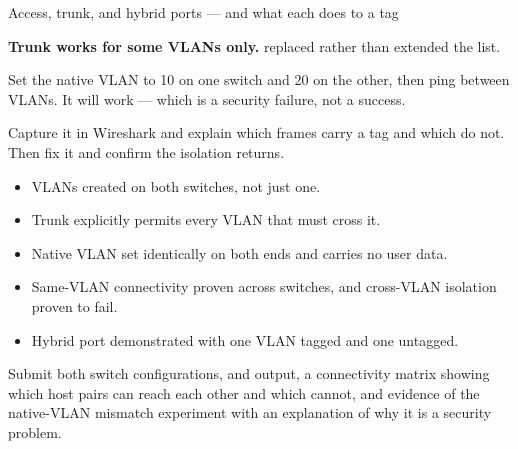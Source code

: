 \begin{labproject}{Access, trunk, and hybrid ports --- and what each does to a tag}
\begin{troubleshoot}
\textbf{Trunk works for some VLANs only.}  replaced rather than extended the list.
\end{troubleshoot}

\begin{tryit}
Set the native VLAN to 10 on one switch and 20 on the other, then ping between VLANs. It will work --- which is a security failure, not a success.

Capture it in Wireshark and explain which frames carry a tag and which do not. Then fix it and confirm the isolation returns.
\end{tryit}
\end{labproject}

\begin{verification}
\begin{itemize}
  \item VLANs created on both switches, not just one.
  \item Trunk explicitly permits every VLAN that must cross it.
  \item Native VLAN set identically on both ends and carries no user data.
  \item Same-VLAN connectivity proven across switches, and cross-VLAN isolation proven to fail.
  \item Hybrid port demonstrated with one VLAN tagged and one untagged.
\end{itemize}
\end{verification}

\begin{labdeliverable}
Submit both switch configurations,  and  output, a connectivity matrix showing which host pairs can reach each other and which cannot, and evidence of the native-VLAN mismatch experiment with an explanation of why it is a security problem.
\end{labdeliverable}
